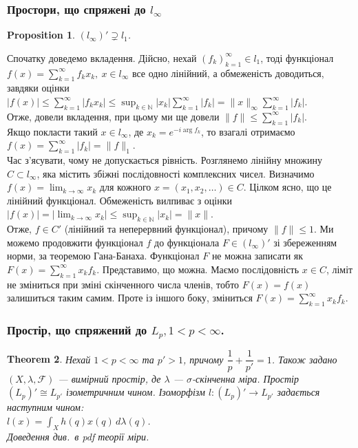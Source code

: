 \documentclass[a4paper, 10pt]{article}
\theoremstyle{theoremdd}
\newtheorem{theorem}{Theorem}[subsection]
\theoremstyle{theoremdd}
\theoremstyle{theoremdd}
\theoremstyle{theoremdd}
\theoremstyle{theoremdd}
\newtheorem{proposition}[theorem]{Proposition}
\theoremstyle{theoremdd}
\theoremstyle{theoremdd}
\theoremstyle{theoremdd}
\begin{document}
\subsubsection{Простори, що спряжені до $l_\infty$}
\begin{proposition}
$(l_\infty)' \supsetneq l_1$.
\end{proposition}
\noindent
Спочатку доведемо вкладення. Дійсно, нехай $(f_k)_{k=1}^\infty \in l_1$, тоді функціонал $f(x) = \displaystyle\sum_{k=1}^\infty f_k x_k,\ x \in l_\infty$ все одно лінійний, а обмеженість доводиться, завдяки оцінки\\
$|f(x)| \leq \displaystyle\sum_{k=1}^\infty |f_k x_k| \leq \sup_{k \in \mathbb{N}} |x_k| \sum_{k=1}^\infty |f_k| = \|x\|_\infty \sum_{k=1}^\infty |f_k|$.\\
Отже, довели вкладення, при цьому ми ще довели $\|f\| \leq \displaystyle\sum_{k=1}^\infty |f_k|$.\\
Якщо покласти такий $x \in l_\infty$, де $x_k = e^{-i \arg f_k}$, то взагалі отримаємо $f(x) = \displaystyle\sum_{k=1}^\infty |f_k| = \|f\|_1$.
\bigskip \\
Час з'ясувати, чому не допускається рівність. Розглянемо лінійну множину $C \subset l_\infty$, яка містить збіжні послідовності комплексних чисел. Визначимо $f(x) = \displaystyle\lim_{k \to \infty} x_k$ для кожного $x = (x_1,x_2,\dots) \in C$. Цілком ясно, що це лінійний функціонал. Обмеженість вилпиває з оцінки $|f(x)| = \displaystyle \left| \lim_{k \to \infty} x_k \right| \leq \sup_{k \in \mathbb{N}} |x_k| = \|x\|$.\\
Отже, $f \in C'$ (лінійний та неперервний функціонал), причому $\|f\| \leq 1$. Ми можемо продовжити функціонал $f$ до функціонала $F \in (l_\infty)'$ зі збереженням норми, за теоремою Гана-Банаха. Функціонал $F$ не можна записати як $F(x) = \displaystyle\sum_{k=1}^\infty x_k f_k$. Представимо, що можна. Маємо послідовність $x \in C$, ліміт не зміниться при зміні скінченного числа членів, тобто $F(x) = f(x)$ залишиться таким самим. Проте із іншого боку, зміниться $F(x) = \displaystyle\sum_{k=1}^\infty x_k f_k$.

\subsubsection{Простір, що спряжений до $L_p, 1 < p < \infty$.}
\begin{theorem}
Нехай $1 < p < \infty$ та $p' > 1$, причому $\dfrac{1}{p} + \dfrac{1}{p'} = 1$. Також задано $(X,\lambda,\mathcal{F})$ --- вимірний простір, де $\lambda$ --- $\sigma$-скінченна міра. Простір $(L_p)' \cong L_{p'}$ ізометричним чином. Ізоморфізм $l \colon (L_p)' \to L_{p'}$ задається наступним чином:\\
$l(x) = \displaystyle\int_X h(q) x(q)\,d\lambda(q)$.\\
\textit{Доведення див.\ в pdf теорії міри.}
\end{theorem}
\end{document}

